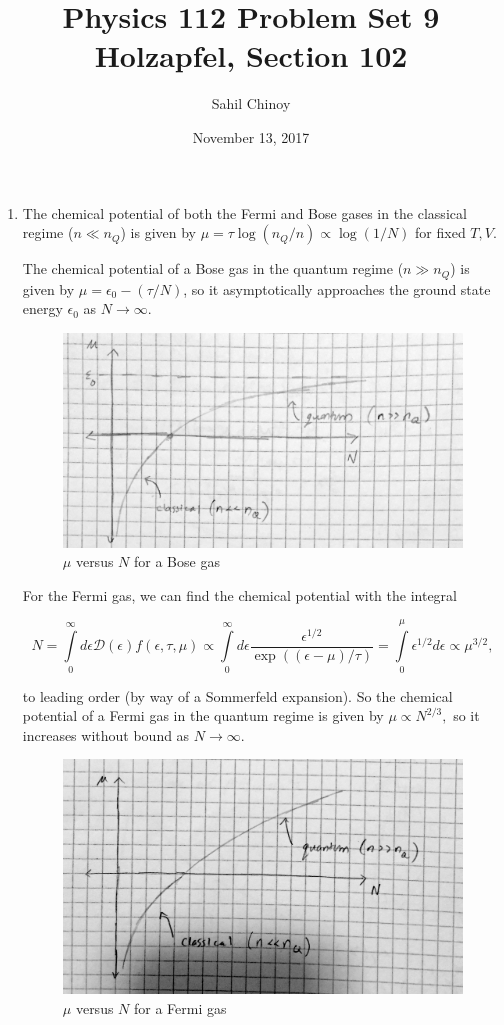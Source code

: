 \documentclass{article}
\title{Physics 112 Problem Set 9 \\ \large{Holzapfel, Section 102}}
\author{Sahil Chinoy}
\date{November 13, 2017}
\begin{document}
\maketitle{}

\begin{enumerate}

	\item

	The chemical potential of both the Fermi and Bose gases in the classical regime ($n \ll n_Q$) is given by $\mu = \tau \log (n_Q/n) \propto \log(1/N)$ for fixed $T, V$.

	The chemical potential of a Bose gas in the quantum regime ($n \gg n_Q$) is given by $\mu = \epsilon_0 - (\tau/N)$, so it asymptotically approaches the ground state energy $\epsilon_0$ as $N \to \infty$.

	\begin{figure}[H]
	\caption{$\mu$ versus $N$ for a Bose gas}
	\centering
	\includegraphics[width=12cm]{img/bose}
	\end{figure}

	For the Fermi gas, we can find the chemical potential with the integral

	$$N = \int \limits_0^\infty d\epsilon \mathcal{D}(\epsilon) f(\epsilon, \tau, \mu) \propto \int \limits_0^\infty d\epsilon \frac{\epsilon^{1/2}}{\exp((\epsilon-\mu)/\tau)} = \int \limits_0^\mu \epsilon^{1/2} d\epsilon \propto \mu^{3/2},$$

	to leading order (by way of a Sommerfeld expansion). So the chemical potential of a Fermi gas in the quantum regime is given by $\mu \propto N^{2/3},$ so it increases without bound as $N \to \infty$. 

	\begin{figure}[H]
	\caption{$\mu$ versus $N$ for a Fermi gas}
	\centering
	\includegraphics[width=12cm]{img/fermi}
	\end{figure}


\end{enumerate}
\end{document}
